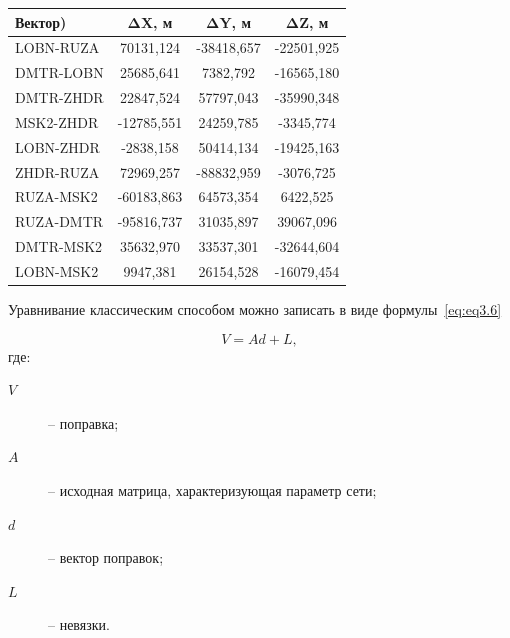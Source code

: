 \begin{table} [htbp]
	\centering\small
	\begin{threeparttable}%
		\label{tab:tab27}
		\setlength{\tabcolsep}{20pt}
		
		\begin{tabular}{ l
				S[table-number-alignment = center]
				S[table-number-alignment = center]
				S[table-number-alignment = center] }
			
			
			\toprule
			\textbf{Вектор)}			& \textbf{ΔX, м}	& \textbf{ΔY, м}	& \textbf{ΔZ, м}	\\ \midrule
			LOBN-RUZA					&  70131,124		& -38418,657		& -22501,925		\\ %
			DMTR-LOBN					&  25685,641		&   7382,792		& -16565,180		\\ %
			DMTR-ZHDR					&  22847,524		&  57797,043		& -35990,348		\\ %
			MSK2-ZHDR					& -12785,551		&  24259,785		&  -3345,774		\\ %
			LOBN-ZHDR					&  -2838,158		&  50414,134		& -19425,163		\\ %
			ZHDR-RUZA					&  72969,257		& -88832,959		&  -3076,725		\\ %
			RUZA-MSK2					& -60183,863		&  64573,354		&   6422,525		\\ %
			RUZA-DMTR					& -95816,737		&  31035,897		&  39067,096		\\ %
			DMTR-MSK2					&  35632,970		&  33537,301		& -32644,604		\\ %
			LOBN-MSK2					&   9947,381		&  26154,528		& -16079,454		\\ \bottomrule
		\end{tabular}
		
	\end{threeparttable}
\end{table}

\label{УКС}
Уравнивание классическим способом можно записать в виде формулы~\cref{eq:eq3.6}

\begin{equation}
	\label{eq:eq3.6}
		V = A d + L,
\end{equation}
где: 
\begin{description}
	\item[$V$] -- поправка; 
	\item[$A$] -- исходная матрица, характеризующая параметр сети;
	\item[$d$] -- вектор поправок;
	\item[$L$] -- невязки.
\end{description}

